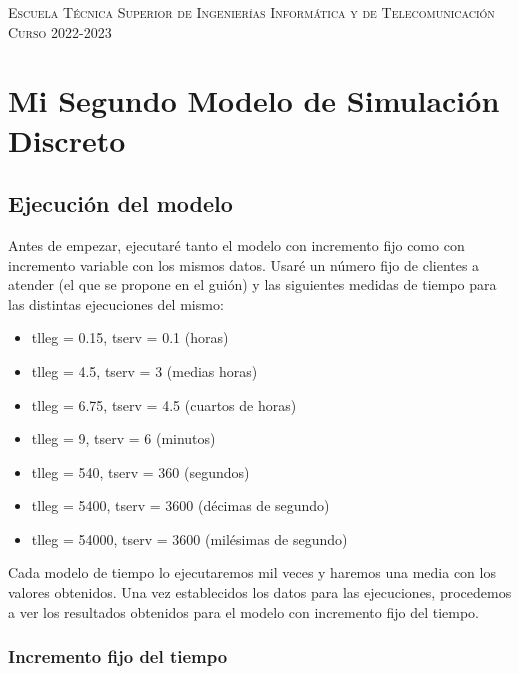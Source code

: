 \documentclass[11pt,a4paper]{report}
\begin{document}
\begin{titlepage}
\begin{minipage}{\textwidth}
\vspace{0.7cm}
\textsc{Escuela Técnica Superior de Ingenierías Informática y de Telecomunicación}\\
\vspace{1cm}
\textsc{Curso 2022-2023}
\end{minipage}
\end{titlepage}

\tableofcontents
\thispagestyle{empty}				%

\newpage

\setlength{\parskip}{1em}

\chapter{Mi Segundo Modelo de Simulación Discreto}
\newpage
\section{Ejecución del modelo}

Antes de empezar, ejecutaré tanto el modelo con incremento fijo como con incremento variable con los mismos datos. Usaré un número fijo de clientes a atender (el que se propone en el guión) y las siguientes medidas de tiempo para las distintas ejecuciones del mismo:

\begin{itemize}
	\item{tlleg = 0.15, tserv = 0.1 (horas)}
	\item{tlleg = 4.5, tserv = 3 (medias horas)}
	\item{tlleg = 6.75, tserv = 4.5 (cuartos de horas)}
	\item{tlleg = 9, tserv = 6 (minutos)}
	\item{tlleg = 540, tserv = 360 (segundos)}
	\item{tlleg = 5400, tserv = 3600 (décimas de segundo)}
	\item{tlleg = 54000, tserv = 3600 (milésimas de segundo)}
\end{itemize}

Cada modelo de tiempo lo ejecutaremos mil veces y haremos una media con los valores obtenidos. Una vez establecidos los datos para las ejecuciones, procedemos a ver los resultados obtenidos para el modelo con incremento fijo del tiempo.

\newpage
\subsection{Incremento fijo del tiempo}
\end{document}

